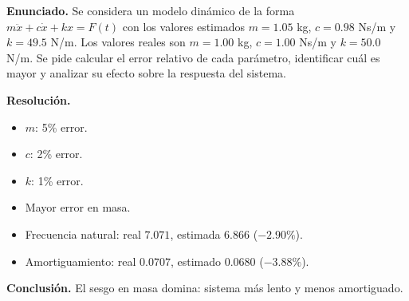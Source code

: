 \documentclass[12pt,a4paper]{report}
\begin{document}
	\textbf{Enunciado.} Se considera un modelo dinámico de la forma $m\ddot x+c\dot x+kx=F(t)$ con los valores estimados $m=1.05$ kg, $c=0.98$ Ns/m y $k=49.5$ N/m. Los valores reales son $m=1.00$ kg, $c=1.00$ Ns/m y $k=50.0$ N/m. Se pide calcular el error relativo de cada parámetro, identificar cuál es mayor y analizar su efecto sobre la respuesta del sistema.
	
	\textbf{Resolución.}
	\begin{itemize}
		\item $m$: 5\% error.
		\item $c$: 2\% error.
		\item $k$: 1\% error.
		\item Mayor error en masa.
		\item Frecuencia natural: real $7.071$, estimada $6.866$ ($-2.90\%$).
		\item Amortiguamiento: real $0.0707$, estimado $0.0680$ ($-3.88\%$).
	\end{itemize}
	
	\textbf{Conclusión.} El sesgo en masa domina: sistema más lento y menos amortiguado.
	
\end{document}
